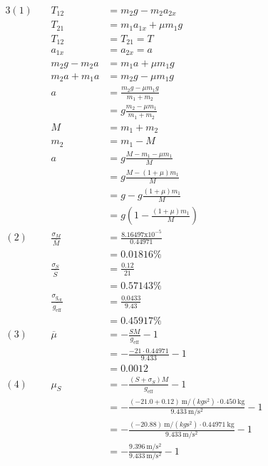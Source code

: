 \documentclass[12pt]{article}
\begin{document}
        \begin{alignat*}{3}
            (1)~
            &&T_{12} &= m_2g - m_2a_{2x}\\
            &&T_{21} &= m_1a_{1x}+\mu m_1g\\
            &&T_{12} &= T_{21}=T\\
            &&a_{1x} &= a_{2x} = a\\
            &&m_2g-m_2a &= m_1a+\mu m_1g\\
            &&m_2a+m_1a &= m_2g-\mu m_1g\\
            &&a &= \frac{m_2g-\mu m_1g}{m_1+m_2}\\
            &&&= g\frac{m_2-\mu m_1}{m_1+m_2}\\
            &&M &= m_1 + m_2\\
            &&m_2 &= m_1 - M\\
            &&a &= g\frac{M-m_1-\mu m_1}{M}\\
            &&&= g\frac{M-(1+\mu)m_1}{M}\\
            &&&= g - g\frac{(1+\mu)m_1}{M}\\
            &&&= g\left(1 - \frac{(1+\mu)m_1}{M}\right)\\
            (2)~
            &&\frac{\sigma_M}{\overline{M}} & = \frac{8.16497\mathrm{x}10^{-5}}{0.44971}\\
            &&& = 0.01816\%\\
            &&\frac{\sigma_S}{\overline{S}} & = \frac{0.12}{21}\\
            &&& = 0.57143\%\\
            &&\frac{\sigma_{g_\mathrm{eff}}}{\overline{g_{\mathrm{eff}}}} & = \frac{0.0433}{9.43}\\
            &&& = 0.45917\%\\
            (3)~
            && \overline{\mu} &= -\frac{SM}{g_\mathrm{eff}}-1\\
            &&& = -\frac{-21 \cdot 0.44971}{9.433}-1\\
            &&& = 0.0012\\
            (4)~&&\mu_S &= -\frac{(S+\sigma_S)M}{g_{\mathrm{eff}}}-1\\
            &&& = -\frac{(-21.0 + 0.12)~\mathrm{m}/(kg\mathrm{s}^2) \cdot 0.450~\mathrm{kg}}{9.433~\mathrm{m}/\mathrm{s}^2}-1\\
            &&& = -\frac{(-20.88)~\mathrm{m}/(kg\mathrm{s}^2) \cdot 0.44971~\mathrm{kg}}{9.433~\mathrm{m}/\mathrm{s}^2}-1\\
            &&& = -\frac{9.396~\mathrm{m}/\mathrm{s}^2}{9.433~\mathrm{m}/\mathrm{s}^2}-1\\

\end{alignat*}
\end{document}

